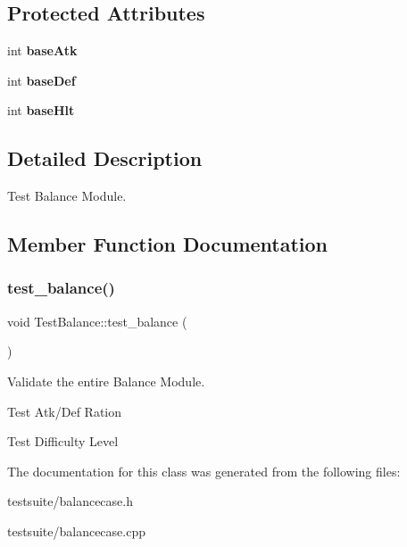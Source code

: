 \subsection*{Protected Attributes}
\begin{DoxyCompactItemize}
\item 
\mbox{\label{classTestBalance_a1b6237814f435b058c5728f06f2eb8b0}} 
int {\bfseries base\+Atk}
\item 
\mbox{\label{classTestBalance_a28a6d57e0637228e8ed2b88276b0dcf3}} 
int {\bfseries base\+Def}
\item 
\mbox{\label{classTestBalance_a0d8b69be5313577ec0ac8d38aba9c03f}} 
int {\bfseries base\+Hlt}
\end{DoxyCompactItemize}


\subsection{Detailed Description}
Test Balance Module. 

\subsection{Member Function Documentation}
\mbox{\label{classTestBalance_a2b91f1822cb997e82a3bc5787f506cfb}} 
\subsubsection{\texorpdfstring{test\+\_\+balance()}{test\_balance()}}
{\footnotesize\ttfamily void Test\+Balance\+::test\+\_\+balance (\begin{DoxyParamCaption}{ }\end{DoxyParamCaption})}



Validate the entire Balance Module. 

Test Atk/\+Def Ration

Test Difficulty Level 

The documentation for this class was generated from the following files\+:\begin{DoxyCompactItemize}
\item 
testsuite/balancecase.\+h\item 
testsuite/balancecase.\+cpp\end{DoxyCompactItemize}
